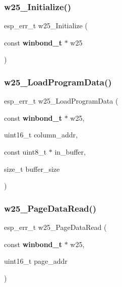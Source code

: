 \subsubsection{w25\+\_\+\+Initialize()}
{\footnotesize\ttfamily esp\+\_\+err\+\_\+t w25\+\_\+\+Initialize (\begin{DoxyParamCaption}\item[{const \textbf{ winbond\+\_\+t} $\ast$}]{w25 }\end{DoxyParamCaption})}

\mbox{\label{_w25_n01_g_v_8h_a49f2aebfa2081217e22c18b7d141d7d0}} 
\subsubsection{w25\+\_\+\+Load\+Program\+Data()}
{\footnotesize\ttfamily esp\+\_\+err\+\_\+t w25\+\_\+\+Load\+Program\+Data (\begin{DoxyParamCaption}\item[{const \textbf{ winbond\+\_\+t} $\ast$}]{w25,  }\item[{uint16\+\_\+t}]{column\+\_\+addr,  }\item[{const uint8\+\_\+t $\ast$}]{in\+\_\+buffer,  }\item[{size\+\_\+t}]{buffer\+\_\+size }\end{DoxyParamCaption})}

\mbox{\label{_w25_n01_g_v_8h_ac7dd63e607cb0f3bea196f63fcae3f96}} 
\subsubsection{w25\+\_\+\+Page\+Data\+Read()}
{\footnotesize\ttfamily esp\+\_\+err\+\_\+t w25\+\_\+\+Page\+Data\+Read (\begin{DoxyParamCaption}\item[{const \textbf{ winbond\+\_\+t} $\ast$}]{w25,  }\item[{uint16\+\_\+t}]{page\+\_\+addr }\end{DoxyParamCaption})}

\mbox{\label{_w25_n01_g_v_8h_a62248c340a28ba708b9f9d482eddf63a}} 
